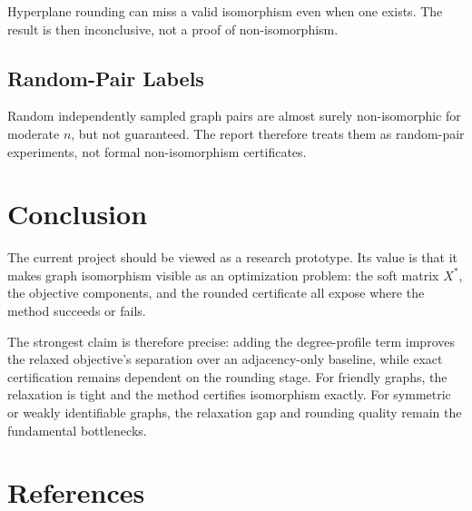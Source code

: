 \documentclass[12pt,a4paper]{article}
\begin{document}
Hyperplane rounding can miss a valid isomorphism even when one exists.  The
result is then inconclusive, not a proof of non-isomorphism.

\subsection{Random-Pair Labels}

Random independently sampled graph pairs are almost surely non-isomorphic for
moderate $n$, but not guaranteed.  The report therefore treats them as
random-pair experiments, not formal non-isomorphism certificates.



\section{Conclusion}\label{sec:conclusion}

The current project should be viewed as a research prototype.  Its value is
that it makes graph isomorphism visible as an optimization problem: the soft
matrix $X^*$, the objective components, and the rounded certificate all expose
where the method succeeds or fails.

The strongest claim is therefore precise: adding the degree-profile term
improves the relaxed objective's separation over an adjacency-only baseline,
while exact certification remains dependent on the rounding stage.  For
friendly graphs, the relaxation is tight and the method certifies isomorphism
exactly.  For symmetric or weakly identifiable graphs, the relaxation gap and
rounding quality remain the fundamental bottlenecks.

\section*{References}
\end{document}
